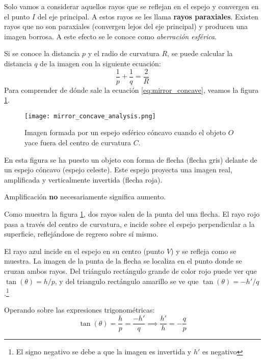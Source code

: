 Solo vamos a considerar aquellos rayos que se reflejan en el espejo y convergen en el punto \(I\) del eje principal. A estos rayos se les llama \textbf{rayos paraxiales}. Existen rayos que no son paraxiales (convergen lejos del eje principal) y producen una imagen borrosa. A este efecto se le conoce como \textit{aberración esférica}.

Si se conoce la distancia \(p\) y el radio de curvatura \(R\), se puede calcular la distancia \(q\) de la imagen con la siguiente ecuación:
\begin{equation}
    \boxed{\frac{1}{p} + \frac{1}{q} = \frac{2}{R}}
    \label{eq:mirror_concave}
\end{equation}
Para comprender de dónde sale la ecuación \ref{eq:mirror_concave}, veamos la figura \ref{fig:mirror_concave_2}.

\begin{figure}[ht]
  \centering
  \texttt{[image: mirror\_concave\_analysis.png]}
  \caption{Imagen formada por un espejo esférico cóncavo cuando el objeto \(O\) yace fuera del centro de curvatura \(C\).}
  \label{fig:mirror_concave_2}
\end{figure}
En esta figura se ha puesto un objeto con forma de flecha (flecha gris) delante de un espejo cóncavo (espejo celeste). Este espejo proyecta una imagen real, amplificada y verticalmente invertida (flecha roja).

\begin{tcolorbox}[mydanger]
  Amplificación \textbf{no} necesariamente significa aumento.
\end{tcolorbox}

Como muestra la figura \ref{fig:mirror_concave_2}, dos rayos salen de la punta del una flecha. El rayo rojo pasa a través del centro de curvatura, e incide sobre el espejo perpendicular a la superficie, reflejándose de regreso sobre sí mismo.

El rayo azul incide en el espejo en su centro (punto \(V\)) y se refleja como se muestra. La imagen de la punta de la flecha se localiza en el punto donde se cruzan ambos rayos. Del triángulo rectángulo grande de color rojo puede ver que \(\tan(\theta) = h/p\), y del triangulo rectángulo amarillo se ve que \(\tan(\theta) = -h'/q\).\footnote{El signo negativo se debe a que la imagen es invertida y \(h'\) es negativo}

Operando sobre las expresiones trigonométricas:
\[
  \tan(\theta) = \frac{h}{p} = \frac{-h'}{q} \implies \frac{h'}{h} = -\frac{q}{p}
\]

